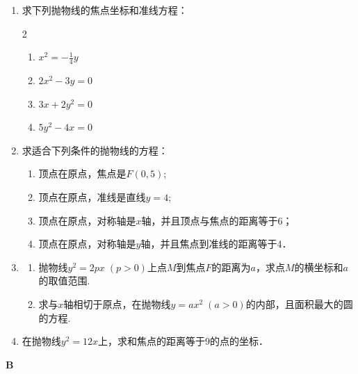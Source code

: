 \begin{enumerate}
  \item 求下列抛物线的焦点坐标和准线方程：
\begin{multicols}{2}
\begin{enumerate}[(1)]
  \item $x^2=-\frac{1}{4}y$
\item $2x^2-3y=0$
\item $3x+2y^2=0$
\item $5y^2-4x=0$ 
\end{enumerate}
\end{multicols}

\item 求适合下列条件的抛物线的方程：
\begin{enumerate}[(1)]
\item 顶点在原点，焦点是$F(0,5)$;
\item 顶点在原点，准线是直线$y=4$;
\item 顶点在原点，对称轴是$x$轴，并且顶点与焦点的距离等于6；
\item 顶点在原点，对称轴是$y$轴，并且焦点到准线的距离等于4．
\end{enumerate}  

\item \begin{enumerate}[(1)]
    \item  抛物线$y^2=2px\; (p>0)$上点$M$到焦点$F$的距离为$a$，求点$M$的横坐标和$a$的取值范围.
    \item 求与$x$轴相切于原点，在抛物线$y=ax^2\; (a>0)$的内部，且面积最大的圆的方程.
\end{enumerate} 

\item 在抛物线$y^2=12x$上，求和焦点的距离等于9的点的坐标．
\end{enumerate}

\begin{center}
    \bfseries B
\end{center}


